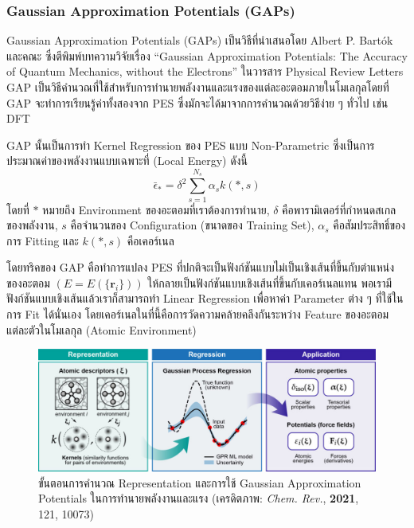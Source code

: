 \subsubsection{Gaussian Approximation Potentials (GAPs)} 

Gaussian Approximation Potentials (GAPs) เป็นวิธีที่นำเสนอโดย Albert P. Bart\'{o}k และคณะ ซึ่งตีพิมพ์บทความวิจัยเรื่อง \enquote{Gaussian Approximation Potentials: The Accuracy of Quantum Mechanics, without the Electrons} ในวารสาร Physical Review Letters\autocite{bartok2010} GAP เป็นวิธีคำนวณที่ใช้สำหรับการทำนายพลังงานและแรงของแต่ละอะตอมภายในโมเลกุลโดยที่ GAP จะทำการเรียนรู้ค่าทั้งสองจาก PES ซึ่งมักจะได้มาจากการคำนวณด้วยวิธีง่าย ๆ ทั่วไป เช่น DFT

GAP นั้นเป็นการทำ Kernel Regression ของ PES แบบ Non-Parametric ซึ่งเป็นการประมาณค่าของพลังงานแบบเฉพาะที่ (Local Energy) ดังนี้
%
\begin{equation}\label{eq:gap}
    \bar{\epsilon}_{\ast} 
    = 
    \delta^{2} \sum\limits_{s = 1}^{N_s} \alpha_{s} k(\ast,s)
\end{equation}
%
\noindent โดยที่ $\ast$ หมายถึง Environment ของอะตอมที่เราต้องการทำนาย, $\delta$ คือพารามิเตอร์ที่กำหนดสเกลของพลังงาน, $s$ คือจำนวนของ Configuration (ขนาดของ Training Set), $\alpha_{s}$ คือสัมประสิทธิ์ของการ Fitting และ $k(\ast,s)$ คือเคอร์เนล

โดยทริคของ GAP คือทำการแปลง PES ที่ปกติจะเป็นฟังก์ชันแบบไม่เป็นเชิงเส้นที่ขึ้นกับตำแหน่งของอะตอม $(E = E(\{ \bm{r}_i \}))$ ให้กลายเป็นฟังก์ชันแบบเชิงเส้นที่ขึ้นกับเคอร์เนลแทน พอเรามีฟังก์ชันแบบเชิงเส้นแล้วเราก็สามารถทำ Linear Regression เพื่อหาค่า Parameter ต่าง ๆ ที่ใช้ในการ Fit ได้นั่นเอง โดยเคอร์เนลในที่นี้คือการวัดความคล้ายคลึงกันระหว่าง Feature ของอะตอมแต่ละตัวในโมเลกุล (Atomic Environment)

\begin{figure}[H]
    \centering
    \includegraphics[width=\linewidth]{fig/gap_procedure.jpeg}
    \caption{ขั้นตอนการคำนวณ Representation และการใช้ Gaussian Approximation Potentials ในการทำนายพลังงานและแรง
        (เครดิตภาพ: \textit{Chem. Rev.}, \textbf{2021}, 121, 10073\autocite{deringer2019})}
    \label{fig:gap_procedure}
\end{figure}

